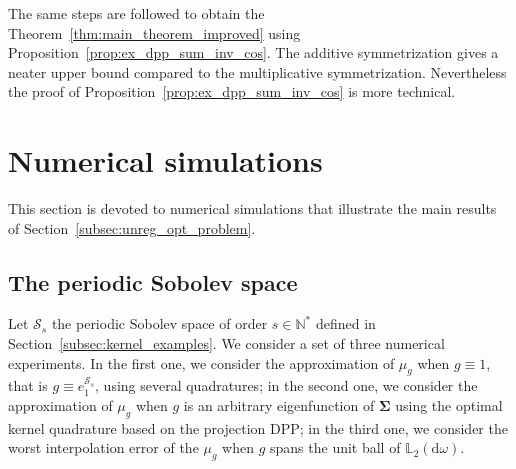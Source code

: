 \documentclass[twoside,11pt]{book}
\numberwithin{theorem}{chapter}
\numberwithin{definition}{chapter}
\numberwithin{proposition}{chapter}
\numberwithin{corollary}{chapter}
\numberwithin{example}{chapter}
\numberwithin{lemma}{chapter}
\numberwithin{assumption}{chapter}
\numberwithin{equation}{chapter}
\numberwithin{figure}{chapter}
\newcommand{\rb}[1]{\textcolor{magenta}{#1}}
\begin{document}
The same steps are followed to obtain the Theorem~\ref{thm:main_theorem_improved} using Proposition~\ref{prop:ex_dpp_sum_inv_cos}.
The additive symmetrization gives a neater upper bound compared to the multiplicative symmetrization. Nevertheless the proof of Proposition~\ref{prop:ex_dpp_sum_inv_cos} is more technical.



\section{Numerical simulations}\label{sec:num_sim_dppkq}
This section is devoted to numerical simulations that illustrate the main results of Section~\ref{subsec:unreg_opt_problem}.

\subsection{The periodic Sobolev space}\label{s:sobolev_numsim}
Let $\mathcal{S}_{s}$ the periodic Sobolev space of order $s \in \mathbb{N}^{*}$ defined in Section~\ref{subsec:kernel_examples}.
We consider a set of three numerical experiments. In the first one, we consider the approximation of $\mu_{g}$ when $g \equiv 1$, that is $g \equiv e^{\mathcal{S}_{s}}_{1}$, using several quadratures; in the second one, we consider the approximation of $\mu_{g}$ when $g$ is an arbitrary eigenfunction of $\bm{\Sigma}$ using the optimal kernel quadrature based on the projection DPP; in the third one, we consider the worst interpolation error of the $\mu_g$ when $g$ spans the unit ball of $\mathbb{L}_{2}(\mathrm{d}\omega)$. 
\end{document}
